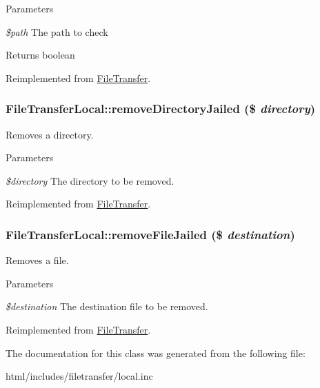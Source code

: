 \begin{DoxyParams}{Parameters}
\item[{\em \$path}]The path to check\end{DoxyParams}
\begin{DoxyReturn}{Returns}
boolean 
\end{DoxyReturn}


Reimplemented from \hyperlink{classFileTransfer_a0522f0f47d022f2cf8fe375b983d4e39}{FileTransfer}.\hypertarget{classFileTransferLocal_a59e9071509cb3abc3eeb407151b2e72d}{
\subsubsection[{removeDirectoryJailed}]{\setlength{\rightskip}{0pt plus 5cm}FileTransferLocal::removeDirectoryJailed (\$ {\em directory})}}
\label{classFileTransferLocal_a59e9071509cb3abc3eeb407151b2e72d}
Removes a directory.


\begin{DoxyParams}{Parameters}
\item[{\em \$directory}]The directory to be removed. \end{DoxyParams}


Reimplemented from \hyperlink{classFileTransfer_a9b9a21556d191235b3a5f85c15878789}{FileTransfer}.\hypertarget{classFileTransferLocal_aa7e7102eef93d90da81df65bb2033d93}{
\subsubsection[{removeFileJailed}]{\setlength{\rightskip}{0pt plus 5cm}FileTransferLocal::removeFileJailed (\$ {\em destination})}}
\label{classFileTransferLocal_aa7e7102eef93d90da81df65bb2033d93}
Removes a file.


\begin{DoxyParams}{Parameters}
\item[{\em \$destination}]The destination file to be removed. \end{DoxyParams}


Reimplemented from \hyperlink{classFileTransfer_aa699cbea5def346f1d5ce818b0fa7ea7}{FileTransfer}.

The documentation for this class was generated from the following file:\begin{DoxyCompactItemize}
\item 
html/includes/filetransfer/local.inc\end{DoxyCompactItemize}
